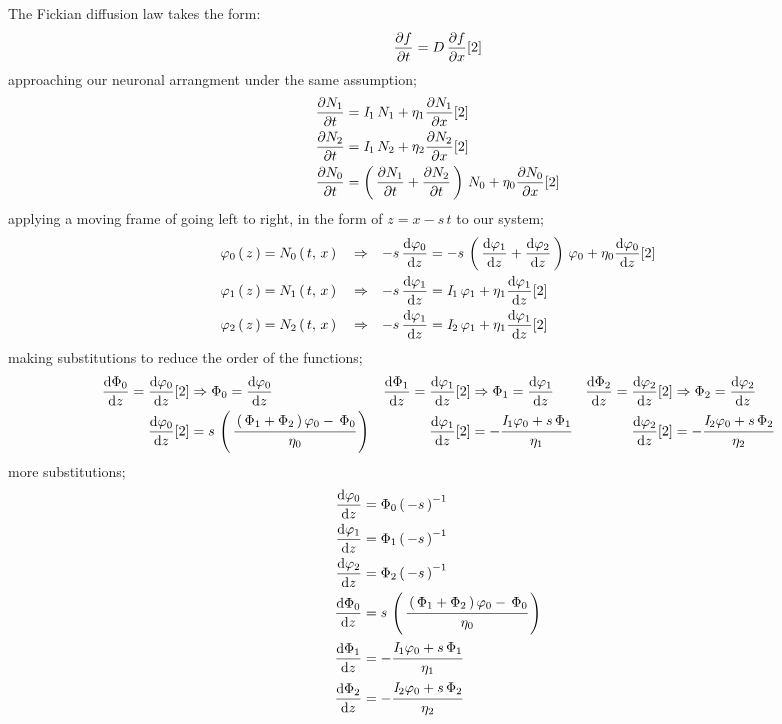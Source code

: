\documentclass[class={myRUCProject}, crop=false]{standalone}
\begin{document}
The Fickian diffusion law takes the form:
\begin{equation}
    \pde{t}{f} = D\,\pde{x}{f}[2]
\end{equation}
approaching our neuronal arrangment under the same assumption;
\begin{align}
    \pde{t}{N_1} &= \curr_1\,N_1 + \eta_1\pde{x}{N_1}[2] \\
    \pde{t}{N_2} &= \curr_1\,N_2 + \eta_2\pde{x}{N_2}[2] \\
    \pde{t}{N_0} &= \br{\pde{t}{N_1}+\pde{t}{N_2}}\,N_0 + \eta_0\pde{x}{N_0}[2] 
\end{align}
applying a moving frame of going left to right, in the form of \(z=x-s\,t\) to our system;
\begin{align}
    \varphi_0\br{z} &= N_0\br{t,\,x} &&\implies& -s\,\ode[z]{\varphi_0} &= -s\,\br{\ode[z]{\varphi_1}+\ode[z]{\varphi_2}}\,\varphi_0 + \eta_0\ode[z]{\varphi_0}[2] \\
    \varphi_1\br{z} &= N_1\br{t,\,x} &&\implies& -s\,\ode[z]{\varphi_1} &= \curr_1\,\varphi_1 + \eta_1\ode[z]{\varphi_1}[2] \\
    \varphi_2\br{z} &= N_2\br{t,\,x} &&\implies& -s\,\ode[z]{\varphi_1} &= \curr_2\,\varphi_1 + \eta_1\ode[z]{\varphi_1}[2] 
\end{align}
making substitutions to reduce the order of the functions;
\begin{align*}
    \ode[z]{\Phi_0} = \ode[z]{\varphi_0}[2] &\implies \Phi_0 = \ode[z]{\varphi_0} &
    \ode[z]{\Phi_1} = \ode[z]{\varphi_1}[2] &\implies \Phi_1 = \ode[z]{\varphi_1} &
    \ode[z]{\Phi_2} = \ode[z]{\varphi_2}[2] &\implies \Phi_2 = \ode[z]{\varphi_2}\\
    \ode[z]{\varphi_0}[2] &= s\,\br{\cfrac{\br{\Phi_1+\Phi_2}\varphi_0 - \,\Phi_0}{\eta_0}} &
    \ode[z]{\varphi_1}[2] &= -\cfrac{\curr_1 \varphi_0 + s \,\Phi_1}{\eta_1} &
    \ode[z]{\varphi_2}[2] &= -\cfrac{\curr_2 \varphi_0 + s \,\Phi_2}{\eta_2} 
\end{align*}
more substitutions;
\begin{align}
    \ode[z]{\varphi_0} &= {\Phi_0}\br{-s}^{-1} \\
    \ode[z]{\varphi_1} &= {\Phi_1}\br{-s}^{-1} \\
    \ode[z]{\varphi_2} &= {\Phi_2}\br{-s}^{-1} \\
    \ode[z]{\Phi_0} &= s\,\br{\cfrac{\br{\Phi_1+\Phi_2}\varphi_0 - \,\Phi_0}{\eta_0}} \\
    \ode[z]{\Phi_1} &= -\cfrac{\curr_1 \varphi_0 + s \,\Phi_1}{\eta_1}\\
    \ode[z]{\Phi_2} &= -\cfrac{\curr_2 \varphi_0 + s \,\Phi_2}{\eta_2}
\end{align}
\end{document}
